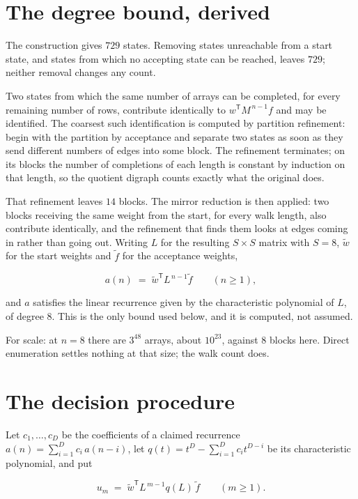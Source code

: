 \documentclass[11pt]{article}
\theoremstyle{definition}
\begin{document}
\section{The degree bound, derived}

The construction gives $729$ states. Removing states unreachable from a start state, and states from which no accepting state can be reached, leaves $729$; neither removal changes any count.

Two states from which the same number of arrays can be completed, for every remaining number of rows, contribute identically to $w^{\mathsf T}M^{\,n-1}f$ and may be identified. The coarsest such identification is computed by partition refinement: begin with the partition by acceptance and separate two states as soon as they send different numbers of edges into some block. The refinement terminates; on its blocks the number of completions of each length is constant by induction on that length, so the quotient digraph counts exactly what the original does.

That refinement leaves $14$ blocks. The mirror reduction is then applied: two blocks receiving the same weight from the start, for every walk length, also contribute identically, and the refinement that finds them looks at edges coming in rather than going out. Writing $L$ for the resulting $S \times S$ matrix with $S = 8$, $\tilde w$ for the start weights and $\tilde f$ for the acceptance weights,

\[a(n) \;=\; \tilde w^{\mathsf T} L^{\,n-1} \tilde f \qquad (n \ge 1),\]

and $a$ satisfies the linear recurrence given by the characteristic polynomial of $L$, of degree $8$. This is the only bound used below, and it is computed, not assumed.

For scale: at $n = 8$ there are $3^{48}$ arrays, about $10^{23}$, against $8$ blocks here. Direct enumeration settles nothing at that size; the walk count does.

\section{The decision procedure}

Let $c_1,\dots,c_D$ be the coefficients of a claimed recurrence $a(n) = \sum_{i=1}^{D} c_i\,a(n-i)$, let $q(t) = t^{D} - \sum_{i=1}^{D} c_i t^{D-i}$ be its characteristic polynomial, and put

\[u_m \;=\; \tilde w^{\mathsf T} L^{\,m-1} q(L)\,\tilde f \qquad (m \ge 1).\]
\end{document}
